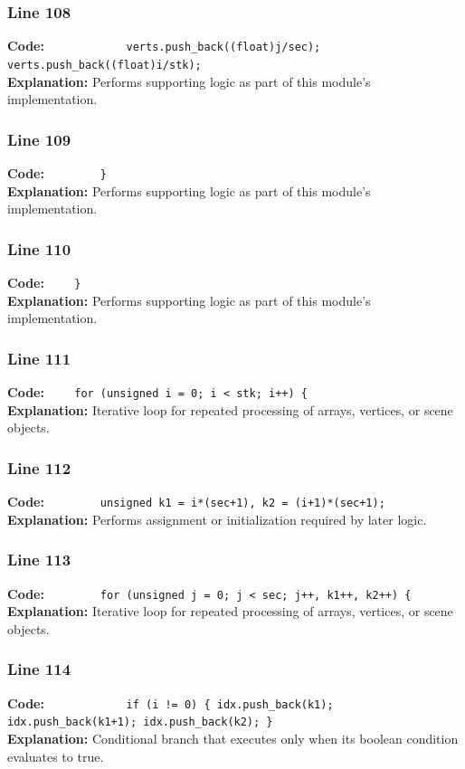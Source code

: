 \documentclass[11pt,a4paper]{article}
\begin{document}
\subsubsection*{Line 108}
\textbf{Code:} \verb|            verts.push_back((float)j/sec); verts.push_back((float)i/stk);|\\
\textbf{Explanation:} Performs supporting logic as part of this module's implementation.

\subsubsection*{Line 109}
\textbf{Code:} \verb|        }|\\
\textbf{Explanation:} Performs supporting logic as part of this module's implementation.

\subsubsection*{Line 110}
\textbf{Code:} \verb|    }|\\
\textbf{Explanation:} Performs supporting logic as part of this module's implementation.

\subsubsection*{Line 111}
\textbf{Code:} \verb|    for (unsigned i = 0; i < stk; i++) {|\\
\textbf{Explanation:} Iterative loop for repeated processing of arrays, vertices, or scene objects.

\subsubsection*{Line 112}
\textbf{Code:} \verb|        unsigned k1 = i*(sec+1), k2 = (i+1)*(sec+1);|\\
\textbf{Explanation:} Performs assignment or initialization required by later logic.

\subsubsection*{Line 113}
\textbf{Code:} \verb|        for (unsigned j = 0; j < sec; j++, k1++, k2++) {|\\
\textbf{Explanation:} Iterative loop for repeated processing of arrays, vertices, or scene objects.

\subsubsection*{Line 114}
\textbf{Code:} \verb|            if (i != 0) { idx.push_back(k1); idx.push_back(k1+1); idx.push_back(k2); }|\\
\textbf{Explanation:} Conditional branch that executes only when its boolean condition evaluates to true.
\end{document}
